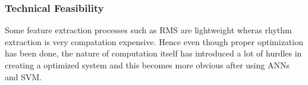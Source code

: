 \subsubsection{Technical Feasibility}
    Some feature extraction processes such as RMS are lightweight wheras rhythm extraction is very compatation expensive. Hence even though proper optimization has been done, the nature of computation itself has introduced a lot of
    hurdles in creating a optimized system and this becomes more obvious after using ANNs and SVM.
